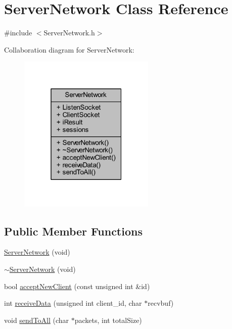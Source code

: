 \hypertarget{class_server_network}{}\section{Server\+Network Class Reference}
\label{class_server_network}


{\ttfamily \#include $<$Server\+Network.\+h$>$}



Collaboration diagram for Server\+Network\+:
\nopagebreak
\begin{figure}[H]
\begin{center}
\leavevmode
\includegraphics[width=184pt]{class_server_network__coll__graph}
\end{center}
\end{figure}
\subsection*{Public Member Functions}
\begin{DoxyCompactItemize}
\item 
\mbox{\hyperlink{class_server_network_ae5ef6aa3aa8c12d9e72a36873bf0f92a}{Server\+Network}} (void)
\item 
\mbox{\hyperlink{class_server_network_a105ccb70cf8cd161dc01076fe72e6cfe}{$\sim$\+Server\+Network}} (void)
\item 
bool \mbox{\hyperlink{class_server_network_a88e6b758f3c4272463aac8c10908b036}{accept\+New\+Client}} (const unsigned int \&id)
\item 
int \mbox{\hyperlink{class_server_network_a51b2272cbdf4f723c105ed08384772da}{receive\+Data}} (unsigned int client\+\_\+id, char $\ast$recvbuf)
\item 
void \mbox{\hyperlink{class_server_network_a33f470f2d8b21035731c2dcce5348d43}{send\+To\+All}} (char $\ast$packets, int total\+Size)
\end{DoxyCompactItemize}
